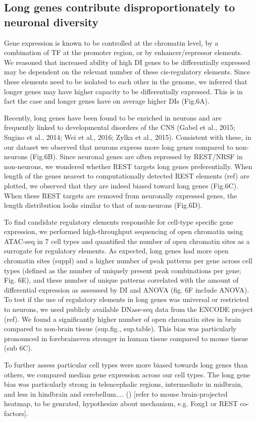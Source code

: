 \subsection{Long genes contribute disproportionately to neuronal diversity}

Gene expression is known to be controlled at the chromatin level, by a combination of TF at the promoter region, or by enhancer/repressor elements. We reasoned that increased ability of high DI genes to be differentially expressed may be dependent on the relevant number of these cis-regulatory elements. Since these elements need to be isolated to each other in the genome, we inferred that longer genes may have higher capacity to be differentially expressed. This is in fact the case and longer genes have on average higher DIs (Fig.6A).

Recently, long genes have been found to be enriched in neurons and are frequently linked to developmental disorders of the CNS (Gabel et al., 2015; Sugino et al., 2014; Wei et al., 2016; Zylka et al., 2015). Consistent with these, in our dataset we observed that neurons express more long genes compared to non-neurons (Fig.6B). Since neuronal genes are often repressed by REST/NRSF in non-neurons, we wondered whether REST targets long genes preferentially. When length of the genes nearest to computationally detected REST elements (ref) are plotted, we observed that they are indeed biased toward long genes (Fig.6C). When these REST targets are removed from neuronally expressed genes, the length distribution looks similar to that of non-neurons (Fig.6D).

To find candidate regulatory elements responsible for cell-type specific gene expression, we performed high-throughput sequencing of open chromatin using ATAC-seq in 7 cell types and quantified the number of open chromatin sites as a surrogate for regulatory elements. As expected, long genes had more open chromatin sites (suppl) and a higher number of peak patterns per gene across cell types (defined as the number of uniquely present peak combinations per gene;  Fig. 6E), and these number of unique patterns correlated with the amount of differential expression as assesssed by DI and ANOVA (fig. 6F include ANOVA).
To test if the use of regulatory elements in long genes was universal or restricted to neurons, we used publicly available DNase-seq data from the ENCODE project (ref). We found a significantly higher number of open chromatin sites in brain compared to non-brain tissue (sup.fig., sup.table). This bias was  particularly pronounced in forebraineven stronger in human tissue compared to mouse tissue (sub 6C).

To further assess particular cell types were more biased towards long genes than others, we compared median gene expression across our cell types. The long gene bias was particularly strong in telencephalic regions, intermediate in midbrain, and less in hindbrain and cerebellum.... () [refer to mouse brain-projected heatmap, to be genrated, hypothesize about mechanism, e.g. Foxg1 or REST co-factors].
